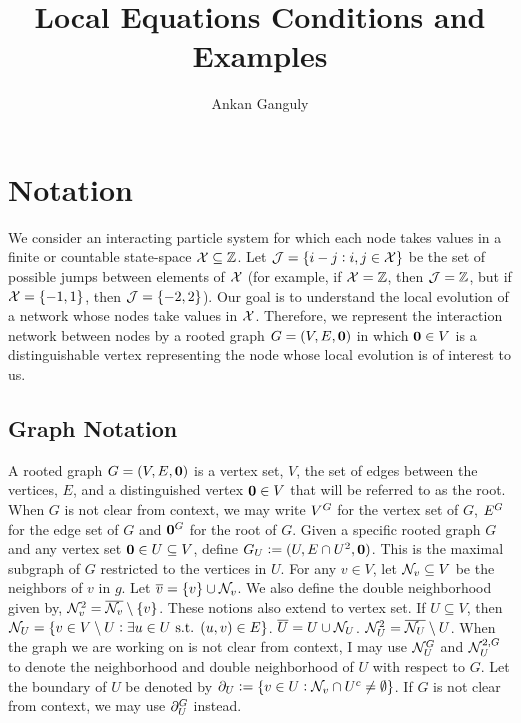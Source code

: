 



\title{Local Equations Conditions and Examples}
\author{Ankan Ganguly}

\maketitle

\newpage

\tableofcontents

\newpage


\section{Notation}
\label{not}

We consider an interacting particle system for which each node takes values in a finite or countable state-space \(\mathcal{X} \subseteq \mathbb{Z}\). Let \(\mathcal{J} = \{i-j:i,j \in \mathcal{X}\}\) be the set of possible jumps between elements of \(\mathcal{X}\) (for example, if \(\mathcal{X} = \mathbb{Z}\), then \(\mathcal{J} = \mathbb{Z}\), but if \(\mathcal{X} = \{-1,1\}\), then \(\mathcal{J} = \{-2,2\}\)). Our goal is to understand the local evolution of a network whose nodes take values in \(\mathcal{X}\). Therefore, we represent the interaction network between nodes by a rooted graph \(G = (V,E,\mathbf{0})\) in which \(\mathbf{0} \in V\) is a distinguishable vertex representing the node whose local evolution is of interest to us.

\subsection{Graph Notation}
\label{not::g}

A rooted graph \(G = (V,E,\mathbf{0})\) is a vertex set, \(V\), the set of edges between the vertices, \(E\), and a distinguished vertex \(\mathbf{0} \in V\) that will be referred to as the root. When \(G\) is not clear from context, we may write \(V^{G}\) for the vertex set of \(G\), \(E^{G}\) for the edge set of \(G\) and \(\mathbf{0}^{G}\) for the root of \(G\). Given a specific rooted graph \(G\) and any vertex set \(\mathbf{0} \in U \subseteq V\), define \(G_{U} := (U,E\cap U^2,\mathbf{0})\). This is the maximal subgraph of \(G\) restricted to the vertices in \(U\). For any \(v \in V\), let \(\mathcal{N}_{v}\subseteq V\) be the neighbors of \(v\) in \(g\). Let \(\overline{v} = \{v\}\cup\mathcal{N}_{v}\). We also define the double neighborhood given by, \(\mathcal{N}^2_{v} = \overline{\mathcal{N}_{v}}\setminus \{v\}\). 
 These notions also extend to vertex set. If \(U\subseteq V\), then \(\mathcal{N}_{U} = \{v \in V\setminus U: \exists u \in U\text{ s.t. } (u,v) \in E\}\). \(\overline{U} = U\cup \mathcal{N}_{U}\). \(\mathcal{N}^2_{U} = \overline{\mathcal{N}_{U}}\setminus U\).
 When the graph we are working on is not clear from context, I may use \(\mathcal{N}^{G}_{U}\) and \(\mathcal{N}^{2,G}_{U}\) to denote the neighborhood and double neighborhood of \(U\) with respect to \(G\). Let the boundary of \(U\) be denoted by \(\partial_{U} := \{v \in U: \mathcal{N}_{v}\cap U^c \neq \emptyset\}\). If \(G\) is not clear from context, we may use \(\partial^{G}_{U}\) instead.

